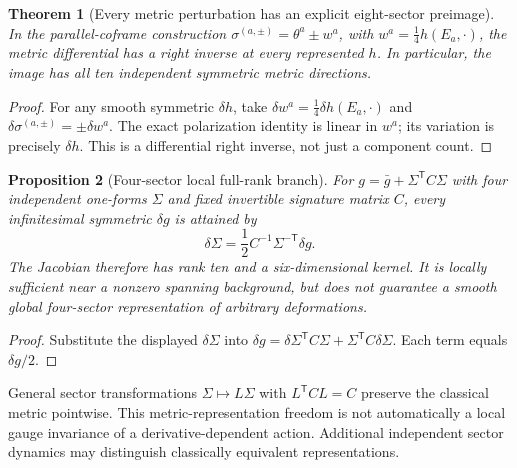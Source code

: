 \documentclass[11pt,a4paper]{article}
\newtheorem{theorem}{Theorem}[section]
\newtheorem{proposition}[theorem]{Proposition}
\begin{document}
\begin{theorem}[Every metric perturbation has an explicit eight-sector preimage]\label{thm:eight-right-inverse}
In the parallel-coframe construction \(\sigma^{(a,\pm)}=\theta^a\pm w^a\), with \(w^a=\frac14 h(E_a,\cdot)\), the metric differential has a right inverse at \emph{every} represented \(h\). In particular, the image has all ten independent symmetric metric directions.
\end{theorem}
\begin{proof}
For any smooth symmetric \(\delta h\), take \(\delta w^a=\frac14\delta h(E_a,\cdot)\) and \(\delta\sigma^{(a,\pm)}=\pm\delta w^a\). The exact polarization identity is linear in \(w^a\); its variation is precisely \(\delta h\). This is a differential right inverse, not just a component count.\end{proof}

\begin{proposition}[Four-sector local full-rank branch]\label{prop:four-rank}
For \(g=\bar g+\Sigma^{\mathsf T}C\Sigma\) with four independent one-forms \(\Sigma\) and fixed invertible signature matrix \(C\), every infinitesimal symmetric \(\delta g\) is attained by
\begin{equation}\label{eq:four-right-inverse}
 \delta\Sigma=\frac12C^{-1}\Sigma^{-\mathsf T}\delta g.
\end{equation}
The Jacobian therefore has rank ten and a six-dimensional kernel. It is locally sufficient near a nonzero spanning background, but does not guarantee a smooth global four-sector representation of arbitrary deformations.
\end{proposition}
\begin{proof}
Substitute the displayed \(\delta\Sigma\) into \(\delta g=\delta\Sigma^{\mathsf T}C\Sigma+\Sigma^{\mathsf T}C\delta\Sigma\). Each term equals \(\delta g/2\).\end{proof}

\noindent General sector transformations \(\Sigma\mapsto L\Sigma\) with \(L^{\mathsf T}CL=C\) preserve the classical metric pointwise. This metric-representation freedom is not automatically a local gauge invariance of a derivative-dependent action. Additional independent sector dynamics may distinguish classically equivalent representations.
\end{document}

